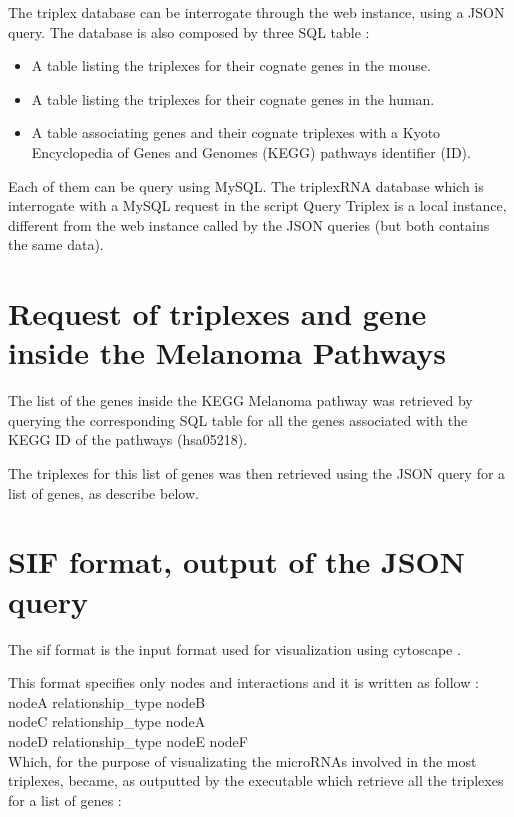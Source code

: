 \documentclass[a4paper,12pt]{report}
\begin{document}
The triplex database can be interrogate through the web instance, using a JSON query. The database is also composed by three SQL table :

\begin{itemize}
	\item A table listing the triplexes for their cognate genes in the mouse. 
	\item A table listing the triplexes for their cognate genes in the human.
	\item A table associating genes and their cognate triplexes with a Kyoto Encyclopedia of Genes and Genomes (KEGG) pathways identifier (ID)\cite{KEGG}.
\end{itemize}

Each of them can be query using MySQL.
The triplexRNA database which is interrogate with a MySQL request in the script Query Triplex is a local instance, different from the web instance called by the JSON queries (but both contains the same data).

\section{Request of triplexes and gene inside the Melanoma Pathways}

The list of the genes inside the KEGG Melanoma pathway\cite{KEGG} was retrieved by querying the corresponding SQL table for all the genes associated with the KEGG ID of the pathways (hsa05218).

The triplexes for this list of genes was then retrieved using the JSON query for a list of genes, as describe below.

\section{SIF format, output of the JSON query}

The sif format is the input format used for visualization using cytoscape \cite{cytoscape}. 

This format specifies only nodes and interactions and it is written as follow :
\\

nodeA relationship\_type nodeB \\
nodeC relationship\_type nodeA \\
nodeD relationship\_type nodeE nodeF \\
Which, for the purpose of visualizating the microRNAs involved in the most triplexes, became, as outputted by the executable which retrieve all the triplexes for a list of genes :
\end{document}
